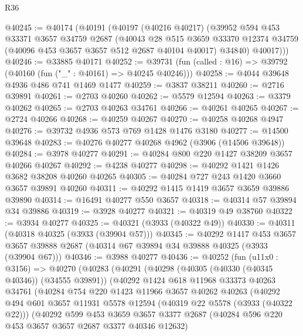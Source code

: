 \begin{lexlean}{R36}
\begin{coremodule}
@40245 := @40174
    (@40191
      (@40197
        (@40216 @40217)
        (@39952
          @594
          @453
          @33371
          @3657
          @34759
          @2687
          (@40043
            @28
            @515
            @3659
            @33370
            @12374
            @34759
            (@40096 @453 @3657 @3657 @512 @2687 @40104 @40017)
            @34840)
          @40017)))
@40246 := @33885 @40171
@40252 := @39731 (fun (called : @16) => @39792 (@40160 (fun ("_" : @40161) => @40245 @40246)))
@40258 := @4044 @39648 @4936 @486 @741 @1469 @1477
@40259 := @3837 @38211
@40260 := @2716 @39891
@40261 := @2703 @40260
@40262 := @5579 @12594
@40263 := @3379 @40262
@40265 := @2703 @40263 @34761
@40266 := @40261 @40265
@40267 := @2724 @40266
@40268 := @40259 @40267
@40270 := @40258 @40268 @4947
@40276 := @39732 @4936 @573 @769 @1428 @1476 @3180
@40277 := @14500 @39648
@40283 := @40276 @40277 @40268 @4962 (@3906 (@14506 @39648))
@40284 := @3978 @40277
@40291 := @40284 @800 @220 @1427 @38209 @3657 @40266 @40267
@40292 := @4238 @40277
@40298 := @40292 @1421 @1426 @3682 @38208 @40260 @40265
@40305 := @40284 @727 @243 @1420 @3660 @3657 @39891 @40260
@40311 := @40292 @1415 @1419 @3657 @3659 @39886 @39890
@40314 := @16491 @40277 @550 @3657
@40318 := @40314 @57 @39894 @34 @39886
@40319 := @3928 @40277
@40321 := @40319 @49 @38760
@40322 := @3934 @40277
@40325 := @40321 (@3933 (@40322 @49))
@40330 := @40311 (@40318 @40325 (@3933 (@39904 @57)))
@40345 := @40292
    @1417
    @453
    @3657
    @3657
    @39888
    @2687
    (@40314 @67 @39894 @34 @39888 @40325 (@3933 (@39904 @67)))
@40346 := @3988 @40277
@40436 := @40252
    (fun (u11x0 : @3156) =>
    @40270
      (@40283
        (@40291
          (@40298
            (@40305 (@40330 (@40345 @40346)) (@34555 @39891))
            (@40292
              @1424
              @618
              @11968
              @33373
              @40263
              @34761
              (@40284
                @754
                @220
                @1423
                @11966
                @3657
                @40262
                @40263
                (@40292
                  @494
                  @601
                  @3657
                  @11931
                  @5578
                  @12594
                  (@40319 @22 @5578 (@3933 (@40322 @22)))
                  (@40292
                    @599
                    @453
                    @3659
                    @3657
                    @3377
                    @2687
                    (@40284 @596 @220 @453 @3657 @3657 @2687 @3377 @40346 @12632)

\end{coremodule}
\end{lexlean}
